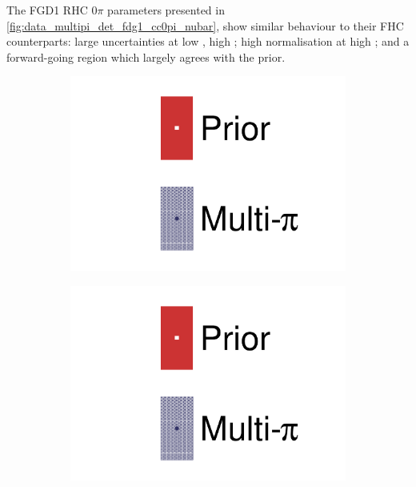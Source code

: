 The FGD1 RHC 0$\pi$ parameters presented in \autoref{fig:data_multipi_det_fdg1_cc0pi_nubar}, show similar behaviour to their FHC counterparts: large uncertainties at low \cosmu, high \pmu; high normalisation at high \pmu; and a forward-going region which largely agrees with the prior. 
\begin{figure}[h]
	\centering
	\begin{subfigure}[t]{0.1\textwidth}
		\includegraphics[width=\textwidth,page=1, trim={0mm 120mm 40mm 20mm}, clip]{figures/mach3/2018/data/2018a_FixedCov_RedCov_Mpi_Data_merge_drawPar_withDet}
	\end{subfigure}
	\begin{subfigure}[t]{0.1\textwidth}
		\includegraphics[width=\textwidth,page=1, trim={0mm 20mm 40mm 120mm}, clip]{figures/mach3/2018/data/2018a_FixedCov_RedCov_Mpi_Data_merge_drawPar_withDet}
	\end{subfigure}


\end{figure}
